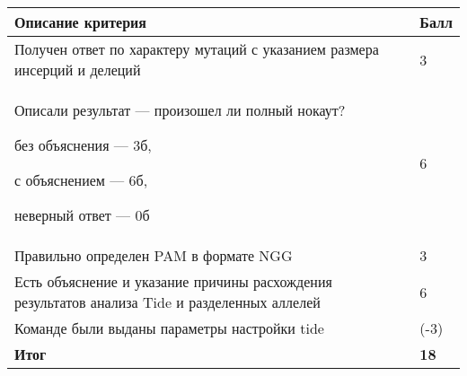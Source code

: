 \begin{tabular}{|p{11cm}|p{3cm}|}
    \hline
    \textbf{Описание критерия} & \textbf{Балл} \\
    \hline
    Получен ответ по характеру мутаций с указанием размера инсерций и делеций & 3 \\
    \hline
    Описали результат — произошел ли полный нокаут? 
    
    без объяснения — 3б, 
    
    с объяснением — 6б, 
    
    неверный ответ — 0б & 6 \\
    \hline
    Правильно определен PAM в формате NGG & 3 \\
    \hline
    Есть объяснение и указание причины расхождения результатов анализа Tide и разделенных аллелей & 6 \\
    \hline
    Команде были выданы параметры настройки tide & (-3) \\
    \hline
    \hline
    \textbf{Итог} & \textbf{18} \\
    \hline
\end{tabular}